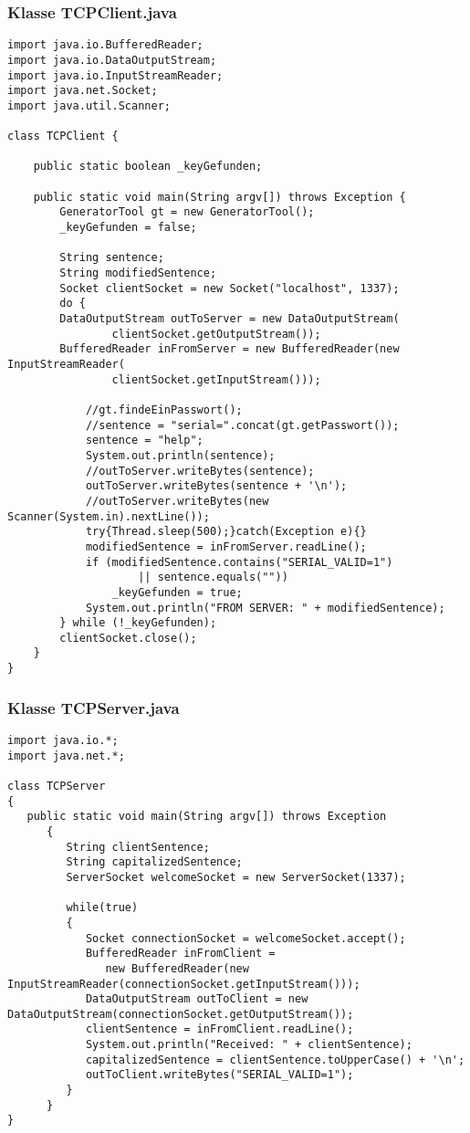 \documentclass[twoside]{article}
\begin{document}
\subsubsection*{Klasse TCPClient.java}
\begin{lstlisting}
import java.io.BufferedReader;
import java.io.DataOutputStream;
import java.io.InputStreamReader;
import java.net.Socket;
import java.util.Scanner;

class TCPClient {

	public static boolean _keyGefunden;

	public static void main(String argv[]) throws Exception {
		GeneratorTool gt = new GeneratorTool();
		_keyGefunden = false;

		String sentence;
		String modifiedSentence;
		Socket clientSocket = new Socket("localhost", 1337);
		do {
		DataOutputStream outToServer = new DataOutputStream(
				clientSocket.getOutputStream());
		BufferedReader inFromServer = new BufferedReader(new InputStreamReader(
				clientSocket.getInputStream()));

			//gt.findeEinPasswort();
			//sentence = "serial=".concat(gt.getPasswort());
			sentence = "help";
			System.out.println(sentence);
			//outToServer.writeBytes(sentence);
			outToServer.writeBytes(sentence + '\n');
			//outToServer.writeBytes(new Scanner(System.in).nextLine());
			try{Thread.sleep(500);}catch(Exception e){}
			modifiedSentence = inFromServer.readLine();
			if (modifiedSentence.contains("SERIAL_VALID=1")
					|| sentence.equals(""))
				_keyGefunden = true;
			System.out.println("FROM SERVER: " + modifiedSentence);
		} while (!_keyGefunden);
		clientSocket.close();
	}
}
\end{lstlisting}
\subsubsection*{Klasse TCPServer.java}
\begin{lstlisting}
import java.io.*;
import java.net.*;

class TCPServer
{
   public static void main(String argv[]) throws Exception
      {
         String clientSentence;
         String capitalizedSentence;
         ServerSocket welcomeSocket = new ServerSocket(1337);

         while(true)
         {
            Socket connectionSocket = welcomeSocket.accept();
            BufferedReader inFromClient =
               new BufferedReader(new InputStreamReader(connectionSocket.getInputStream()));
            DataOutputStream outToClient = new DataOutputStream(connectionSocket.getOutputStream());
            clientSentence = inFromClient.readLine();
            System.out.println("Received: " + clientSentence);
            capitalizedSentence = clientSentence.toUpperCase() + '\n';
            outToClient.writeBytes("SERIAL_VALID=1");
         }
      }
}
\end{lstlisting}
\end{document}
